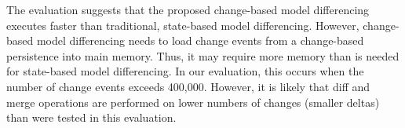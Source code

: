 The evaluation suggests that the proposed change-based model differencing executes faster than traditional, state-based model differencing.
However, change-based model differencing needs to load change events from a change-based persistence into main memory. Thus, it may require more memory than is needed for state-based model differencing. In our evaluation, this occurs when the number of change events exceeds 400,000. However, it is likely that diff and merge operations are performed on lower numbers of changes (smaller deltas) than were tested in this evaluation.

